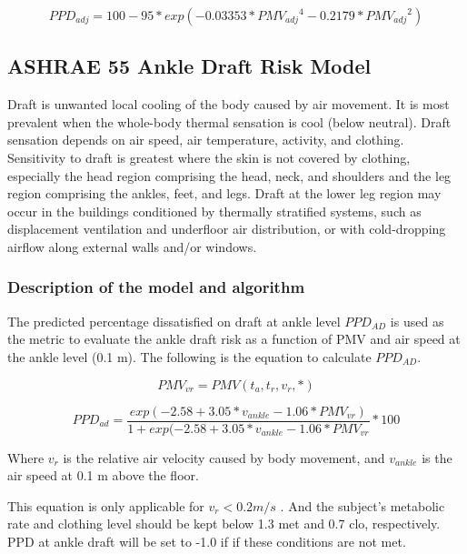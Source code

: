 \begin{equation}
PPD_{adj} = 100 - 95 * exp(-0.03353 * {PMV_{adj}}^4 - 0.2179 * {PMV_{adj}}^2)
\end{equation}

\subsection{ASHRAE 55 Ankle Draft Risk Model}\label{ankle-draft-risk-model}

Draft is unwanted local cooling of the body caused by air movement. It is most prevalent when the whole-body thermal sensation is cool (below neutral). Draft sensation depends on air speed, air temperature, activity, and clothing. Sensitivity to draft is greatest where the skin is not covered by clothing, especially the head region comprising the head, neck, and shoulders and the leg region comprising the ankles, feet, and legs. Draft at the lower leg region may occur in the buildings conditioned by thermally stratified systems, such as displacement ventilation and underfloor air distribution, or with cold-dropping airflow along external walls and/or windows.

\subsubsection{Description of the model and algorithm}\label{description-of-the-model-and-algorithm-5}

The predicted percentage dissatisfied on draft at ankle level \(PPD_{AD}\) is used as the metric to evaluate the ankle draft risk as a function of PMV and air speed at the ankle level (0.1 m). The following is the equation to calculate \(PPD_{AD}\).

\begin{equation}
PMV_{vr} = PMV(t_{a}, t_{r}, v_{r}, *)
\end{equation}

\begin{equation}
PPD_{ad} = \frac{exp⁡(-2.58 + 3.05 * v_{ankle} - 1.06 * PMV_{vr})}{1 + exp⁡(-2.58 + 3.05 * v_{ankle} - 1.06 * PMV_{vr}} * 100
\end{equation}

Where \(v_{r}\) is the relative air velocity caused by body movement, and \(v_{ankle}\) is the air speed at 0.1 m above the floor.

This equation is only applicable for \(v_{r} < 0.2 m/s\) . And the subject’s metabolic rate and clothing level should be kept below 1.3 met and 0.7 clo, respectively. PPD at ankle draft will be set to -1.0 if if these conditions are not met.

